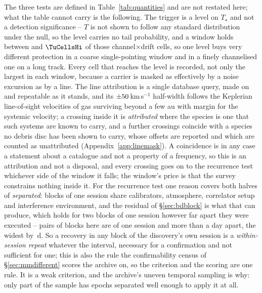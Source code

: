 The three tests are defined in Table~\ref{tab:quantities} and are not restated
here; what the table cannot carry is the following. The trigger is a level on
$T_\star$ and not a detection significance -- $T$ is not shown to follow any
standard distribution under the null, so the level carries no tail probability,
and a window holds between \TuCellsLo{} and $\TuCellsHi$ of those
channel$\times$drift cells, so one level buys very different protection in a
coarse single-pointing window and in a finely channelised one on a long track.
Every cell that reaches the level is recorded, not only the largest in each
window, because a carrier is masked as effectively by a noise excursion as by a
line. The line attribution is a single database query, made on \MkListDate{}
and repeatable as it stands, and its $\pm50$\,km\,s$^{-1}$ half-width
follows the Keplerian line-of-sight velocities of gas surviving beyond a few au
with margin for the systemic velocity; a crossing inside it is
\emph{attributed} where the species is one that such systems are known to
carry, and a further \SoNCrossWord{} crossings coincide with a species no
debris disc has been shown to carry, whose offsets are reported and which are
counted as unattributed (Appendix~\ref{app:linemask}). A coincidence is in any
case a statement about a catalogue and not a property of a frequency, so this
is an attribution and not a disposal, and every crossing goes on to the
recurrence test whichever side of the window it falls; the window's price is
that the survey constrains nothing inside it. For the recurrence test one
reason covers both halves of \emph{separated}: blocks of one session share
calibrators, atmosphere, correlator setup and interference environment, and the
residual of \S\ref{sec:bdblock} is what that can produce, which holds for two
blocks of one session however far apart they were executed -- \QfNPairDrop{}
pairs of blocks here are of one session and more than a day apart, the widest
by \QfSameSessMaxD\,d. So a recovery in any block of the discovery's own
session is a \emph{within-session repeat} whatever the interval, necessary for
a confirmation and not sufficient for one; this is also the rule the
confirmability census of \S\ref{sec:mmdifferent} scores the archive on, so
the criterion and the scoring are one rule. It is a weak criterion, and the
archive's uneven temporal sampling is why: only part of the sample has epochs
separated well enough to apply it at all.

